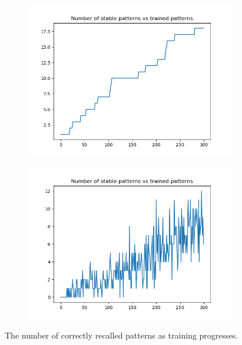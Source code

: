 \documentclass[a4paper]{article}
\begin{document}
\begin{figure}[ht]
   \begin{subfigure}[b]{0.5\textwidth}
   \centering
   \includegraphics[width=\linewidth]{figures/c150.png}
   \label{fig:capa}
   \end{subfigure}
  \begin{subfigure}[b]{0.5\textwidth}
   \centering
   \includegraphics[width=\linewidth]{figures/c150n.png}
   \label{fig:capb}
   \end{subfigure}
   \caption{The number of correctly recalled patterns as training progresses.}
   \label{fig:cap}
\end{figure}
\end{document}
